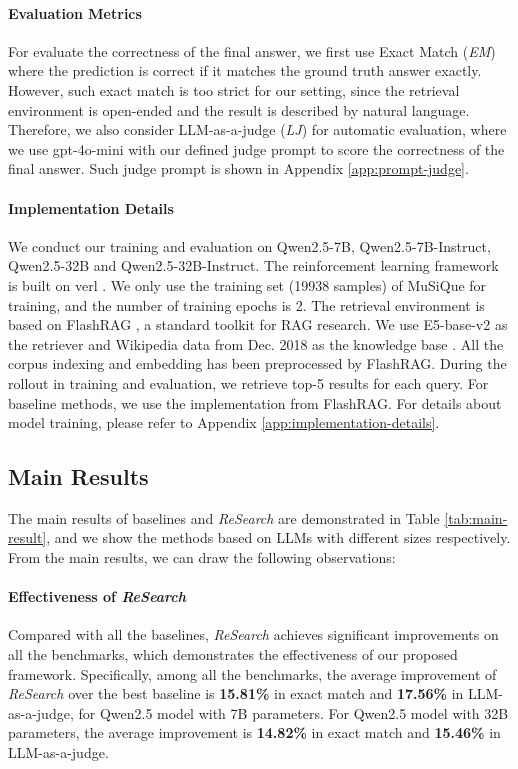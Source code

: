 \documentclass{article}
\begin{document}
\paragraph{Evaluation Metrics}
For evaluate the correctness of the final answer, we first use Exact Match (\textit{EM}) where the prediction is correct if it matches the ground truth answer exactly.
However, such exact match is too strict for our setting, since the retrieval environment is open-ended and the result is described by natural language.
Therefore, we also consider LLM-as-a-judge (\textit{LJ}) for automatic evaluation, where we use gpt-4o-mini with our defined judge prompt to score the correctness of the final answer. Such judge prompt is shown in Appendix \ref{app:prompt-judge}.

\paragraph{Implementation Details}
We conduct our training and evaluation on Qwen2.5-7B, Qwen2.5-7B-Instruct, Qwen2.5-32B and Qwen2.5-32B-Instruct. The reinforcement learning framework is built on verl \cite{hybridflow}. We only use the training set (19938 samples) of MuSiQue for training, and the number of training epochs is 2.
The retrieval environment is based on FlashRAG \cite{flashrag}, a standard toolkit for RAG research. We use E5-base-v2 \cite{e5} as the retriever and Wikipedia data from Dec. 2018 as the knowledge base \cite{dpr}. All the corpus indexing and embedding has been preprocessed by FlashRAG. 
During the rollout in training and evaluation, we retrieve top-5 results for each query. For baseline methods, we use the implementation from FlashRAG.
For details about model training, please refer to Appendix \ref{app:implementation-details}.

\subsection{Main Results}

The main results of baselines and \textit{ReSearch} are demonstrated in Table \ref{tab:main-result}, and we show the methods based on LLMs with different sizes respectively. From the main results, we can draw the following observations:

\paragraph{Effectiveness of \textit{ReSearch}} 
Compared with all the baselines, \textit{ReSearch} achieves significant improvements on all the benchmarks, which demonstrates the effectiveness of our proposed framework. Specifically, among all the benchmarks, the average improvement of \textit{ReSearch} over the best baseline is \textbf{15.81\%} in exact match and \textbf{17.56\%} in LLM-as-a-judge, for Qwen2.5 model with 7B parameters. For Qwen2.5 model with 32B parameters, the average improvement is \textbf{14.82\%} in exact match and \textbf{15.46\%} in LLM-as-a-judge. 
\end{document}

